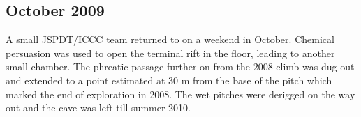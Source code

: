 

\subsection{October 2009}

A small JSPDT/ICCC team returned to  on a weekend in October.
Chemical persuasion was used to open the terminal rift in the floor,
leading to another small chamber. The phreatic passage further on from
the 2008 climb was dug out and extended to a point estimated at 30 m
from the base of the pitch which marked the end of exploration in 2008.
The wet pitches were derigged on the way out and the cave was left till
summer 2010.